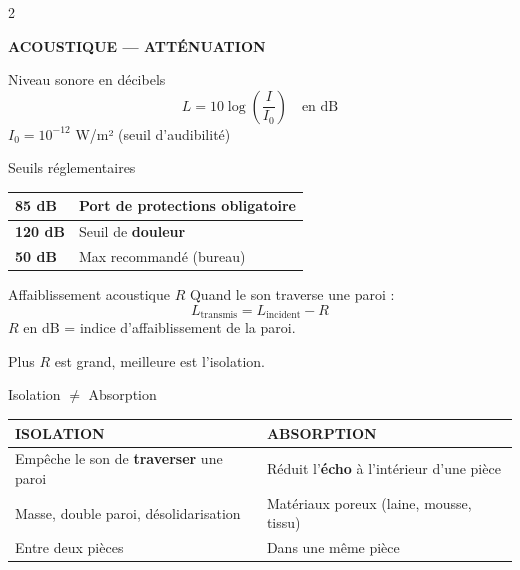 \documentclass[a4paper,10pt]{article}
\begin{document}
\begin{multicols}{2}
\columnbreak

{\large\bfseries\color{vertpro} ACOUSTIQUE — ATTÉNUATION}
\vspace{4pt}

\begin{defbox}{Niveau sonore en décibels}
$$L = 10 \log\!\left(\frac{I}{I_0}\right) \quad \text{en dB}$$
$I_0 = 10^{-12}$ W/m² (seuil d'audibilité)

\begin{center}
\end{center}
\end{defbox}

\begin{defbox}{Seuils réglementaires}
\renewcommand{\arraystretch}{1.3}
\begin{tabular}{|l|l|}
\hline
\textbf{85 dB} & Port de protections \textbf{obligatoire} \\
\hline
\textbf{120 dB} & Seuil de \textbf{douleur} \\
\hline
\textbf{50 dB} & Max recommandé (bureau) \\
\hline
\end{tabular}
\end{defbox}

\begin{defbox}{Affaiblissement acoustique $R$}
Quand le son traverse une paroi :
$$\boxed{L_{\text{transmis}} = L_{\text{incident}} - R}$$
$R$ en dB = indice d'affaiblissement de la paroi.

Plus $R$ est grand, meilleure est l'isolation.
\end{defbox}

\begin{defbox}{Isolation $\neq$ Absorption}
\renewcommand{\arraystretch}{1.4}
\begin{tabular}{|>{\small}p{3.2cm}|>{\small}p{3.2cm}|}
\hline
\textbf{ISOLATION} & \textbf{ABSORPTION} \\
\hline
Empêche le son de \textbf{traverser} une paroi & Réduit l'\textbf{écho} à l'intérieur d'une pièce \\
\hline
Masse, double paroi, désolidarisation & Matériaux poreux (laine, mousse, tissu) \\
\hline
Entre deux pièces & Dans une même pièce \\
\hline
\end{tabular}
\end{defbox}


\end{multicols}
\end{document}
